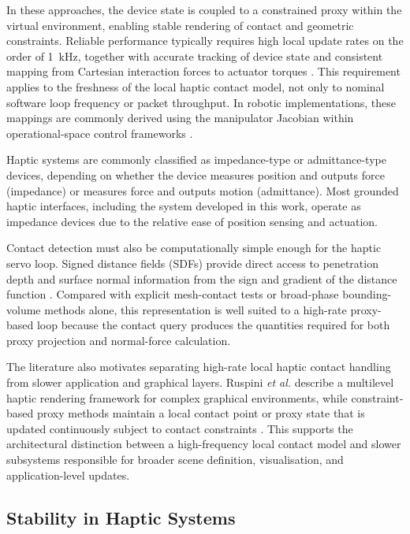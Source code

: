 In these approaches, the device state is coupled to a constrained proxy within the virtual environment, enabling stable rendering of contact and geometric constraints. Reliable performance typically requires high local update rates on the order of 1~kHz, together with accurate tracking of device state and consistent mapping from Cartesian interaction forces to actuator torques \cite{ruspiniHapticDisplayComplex1997}. This requirement applies to the freshness of the local haptic contact model, not only to nominal software loop frequency or packet throughput. In robotic implementations, these mappings are commonly derived using the manipulator Jacobian within operational-space control frameworks \cite{khatibUnifiedApproachMotion1987a}.

Haptic systems are commonly classified as impedance-type or admittance-type devices, depending on whether the device measures position and outputs force (impedance) or measures force and outputs motion (admittance). Most grounded haptic interfaces, including the system developed in this work, operate as impedance devices due to the relative ease of position sensing and actuation.

Contact detection must also be computationally simple enough for the haptic servo loop. Signed distance fields (SDFs) provide direct access to penetration depth and surface normal information from the sign and gradient of the distance function \cite{ericsonRealTimeCollisionDetection2004}. Compared with explicit mesh-contact tests or broad-phase bounding-volume methods alone, this representation is well suited to a high-rate proxy-based loop because the contact query produces the quantities required for both proxy projection and normal-force calculation.

The literature also motivates separating high-rate local haptic contact handling from slower application and graphical layers. Ruspini \emph{et al.} describe a multilevel haptic rendering framework for complex graphical environments, while constraint-based proxy methods maintain a local contact point or proxy state that is updated continuously subject to contact constraints \cite{zillesConstraintbasedGodobjectMethod1995,ruspiniHapticDisplayComplex1997,salisburyHapticRenderingSurfaces1997}. This supports the architectural distinction between a high-frequency local contact model and slower subsystems responsible for broader scene definition, visualisation, and application-level updates.

\subsection{Stability in Haptic Systems}

